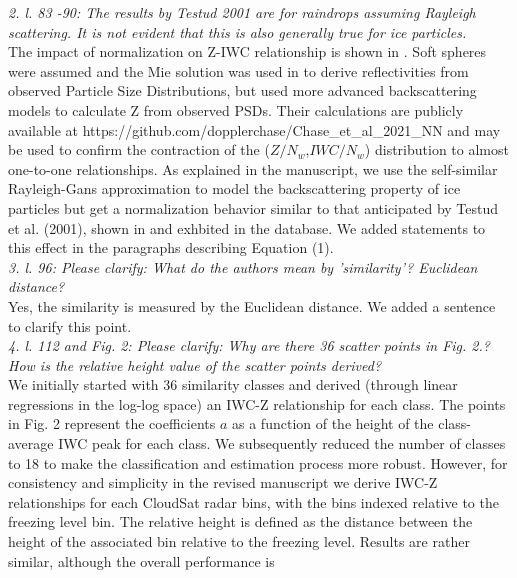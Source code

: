 \documentclass[12pt]{article}
\begin{document}
\textit{2. l. 83 -90: The results by Testud 2001 are for raindrops assuming Rayleigh scattering. It is not evident that this 
    is also generally true for ice particles.}\\
\newline
The impact of normalization on Z-IWC relationship is shown in \cite{delanoe2014}. Soft spheres were assumed and the Mie solution was used in \cite{delanoe2014}
to derive reflectivities from observed Particle Size Distributions, but \cite{chase2021}  used more advanced backscattering models to calculate Z from
observed PSDs.  Their calculations are publicly available at https://github.com/dopplerchase/Chase\_et\_al\_2021\_NN and may be used to confirm the contraction
of the ($Z/N_w$,$IWC/N_w$) distribution to almost one-to-one relationships.  As explained in the manuscript, we use the self-similar Rayleigh-Gans approximation
to model the backscattering property of ice particles but get a normalization behavior similar to that anticipated by Testud et al. (2001),
shown in \cite{delanoe2014} and exhbited in the \cite{chase2021} database.
We added statements to this effect in the paragraphs describing Equation (1).\\
\newline
\textit{3. l. 96: Please clarify: What do the authors mean by 'similarity'? Euclidean distance?}\\
\newline
Yes, the similarity is measured by the Euclidean distance.  We added a sentence to clarify this point.\\
\newline    
\textit{4. l. 112 and Fig. 2: Please clarify: Why are there 36 scatter points in Fig. 2.? How is the relative height value 
    of the scatter points derived?}\\
\newline
We initially started with 36 similarity classes and derived (through linear regressions in the log-log space) 
an IWC-Z relationship for each class. The points in Fig. 2 represent 
the coefficients $a$ as a function of the height of the class-average IWC peak for each class. We subsequently reduced the number of classes 
to 18 to make the classification and 
estimation process more robust. However, for consistency and simplicity in the revised manuscript we derive IWC-Z relationships 
for each CloudSat radar bins, with the bins indexed relative to the freezing level bin.  The relative height is defined as the distance
between the height of the associated bin relative to the freezing level.  Results are rather similar, although the overall performance is
\end{document}
